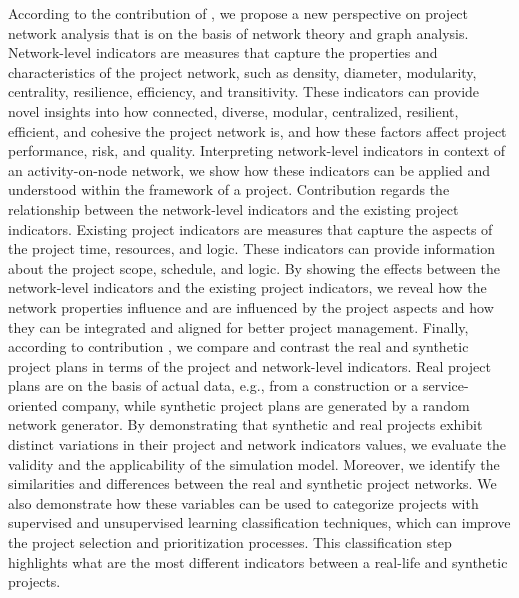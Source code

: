 \documentclass[preprint,
3p]{elsarticle} %
\begin{document}
According to the contribution of , we propose a new
perspective on project network analysis that is on the basis of network
theory and graph analysis. Network-level indicators are measures that
capture the properties and characteristics of the project network, such
as density, diameter, modularity, centrality, resilience, efficiency,
and transitivity. These indicators can provide novel insights into how
connected, diverse, modular, centralized, resilient, efficient, and
cohesive the project network is, and how these factors affect project
performance, risk, and quality. Interpreting network-level indicators in
context of an activity-on-node network, we show how these indicators can
be applied and understood within the framework of a project.
Contribution  regards the relationship between the
network-level indicators and the existing project indicators. Existing
project indicators are measures that capture the aspects of the project
time, resources, and logic. These indicators can provide information
about the project scope, schedule, and logic. By showing the effects
between the network-level indicators and the existing project
indicators, we reveal how the network properties influence and are
influenced by the project aspects and how they can be integrated and
aligned for better project management. Finally, according to
contribution , we compare and contrast the real and
synthetic project plans in terms of the project and network-level
indicators. Real project plans are on the basis of actual data, e.g.,
from a construction or a service-oriented company, while synthetic
project plans are generated by a random network generator. By
demonstrating that synthetic and real projects exhibit distinct
variations in their project and network indicators values, we evaluate
the validity and the applicability of the simulation model. Moreover, we
identify the similarities and differences between the real and synthetic
project networks. We also demonstrate how these variables can be used to
categorize projects with supervised and unsupervised learning
classification techniques, which can improve the project selection and
prioritization processes. This classification step highlights what are
the most different indicators between a real-life and synthetic
projects.
\end{document}
